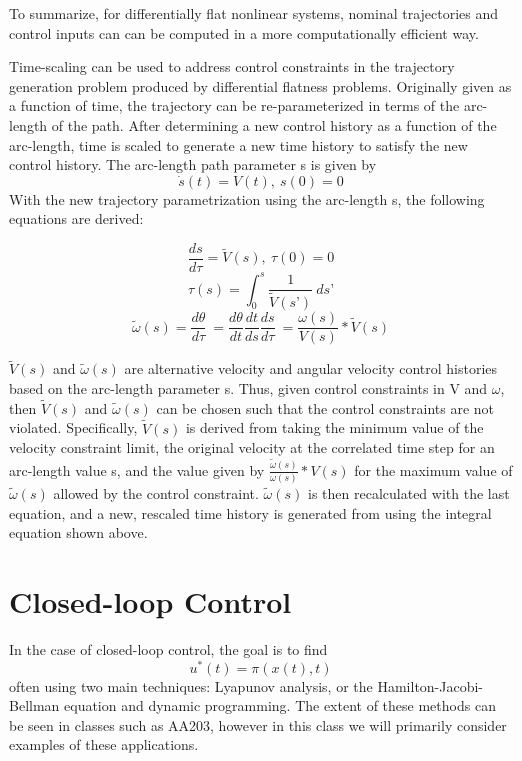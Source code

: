 \documentclass[twoside]{article}
\begin{document}
To summarize, for differentially flat nonlinear systems, nominal trajectories and control inputs can can be computed in a more computationally efficient way.

Time-scaling can be used to address control constraints in the trajectory generation problem produced by differential flatness problems.  Originally given as a function of time, the trajectory can be re-parameterized in terms of the arc-length of the path.  After determining a new control history as a function of the arc-length, time is scaled to generate a new time history to satisfy the new control history.  The arc-length path parameter s is given by
$$ \dot{s}(t) = V(t),  \ s(0)=0 $$ 
With the new trajectory parametrization using the arc-length s, the following equations are derived:

$$\frac{ds}{d\tau} = \widetilde{V}(s) , \ \tau(0)=0$$
$$\tau(s) = \int_{0}^{s} \frac{1}{\widetilde{V}(s’)}\ ds’$$
$$\widetilde{\omega}(s) = \frac{d\theta}{d\tau}\ = \frac{d\theta}{dt}\frac{dt}{ds}\frac{ds}{d\tau}\ = \frac{\omega(s)}{V(s)}*\widetilde{V}(s)$$

$ \widetilde{V}(s)$ and $\widetilde{\omega}(s) $ are alternative velocity and angular velocity control histories based on the arc-length parameter s.  Thus, given control constraints in V and $\omega$, then $ \widetilde{V}(s)$ and $\widetilde{\omega}(s) $ can be chosen such that the control constraints are not violated.  Specifically,   $ \widetilde{V}(s)$ is derived from taking the minimum value of the velocity constraint limit, the original velocity at the correlated time step for an arc-length value s, and the value given by  $ \frac{\widetilde{\omega}(s)}{\omega(s)}*V(s)$ for the maximum value of $\widetilde{\omega}(s)$ allowed by the control constraint.  $\widetilde{\omega}(s) $ is then recalculated with the last equation, and a new, rescaled time history is generated from using the integral equation shown above.

\section{Closed-loop Control}
In the case of closed-loop control, the goal is to find
\begin{equation}
u^*(t)=\pi(x(t),t)
\end{equation}
often using two main techniques: Lyapunov analysis, or the Hamilton-Jacobi-Bellman equation and dynamic programming. The extent of these methods can be seen in classes such as AA203, however in this class we will primarily consider examples of these applications.
\end{document}
